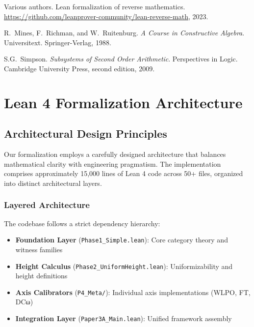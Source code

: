 \documentclass[11pt]{article}
\theoremstyle{plain}
\theoremstyle{definition}
\begin{document}
\begin{thebibliography}{99}
Various authors.
\newblock Lean formalization of reverse mathematics.
\newblock \url{https://github.com/leanprover-community/lean-reverse-math}, 2023.

R.~Mines, F.~Richman, and W.~Ruitenburg.
\newblock \emph{A Course in Constructive Algebra}.
\newblock Universitext. Springer-Verlag, 1988.

S.G.~Simpson.
\newblock \emph{Subsystems of Second Order Arithmetic}.
\newblock Perspectives in Logic. Cambridge University Press, second edition, 2009.

\end{thebibliography}


\appendix

\section{Lean 4 Formalization Architecture}\label{app:formalization}

\subsection{Architectural Design Principles}

Our formalization employs a carefully designed architecture that balances mathematical clarity with engineering pragmatism. The implementation comprises approximately 15,000 lines of Lean 4 code across 50+ files, organized into distinct architectural layers.

\subsubsection{Layered Architecture}

The codebase follows a strict dependency hierarchy:
\begin{itemize}
\item \textbf{Foundation Layer} (\texttt{Phase1\_Simple.lean}): Core category theory and witness families
\item \textbf{Height Calculus} (\texttt{Phase2\_UniformHeight.lean}): Uniformizability and height definitions
\item \textbf{Axis Calibrators} (\texttt{P4\_Meta/}): Individual axis implementations (WLPO, FT, DCω)
\item \textbf{Integration Layer} (\texttt{Paper3A\_Main.lean}): Unified framework assembly
\end{itemize}
\end{document}
